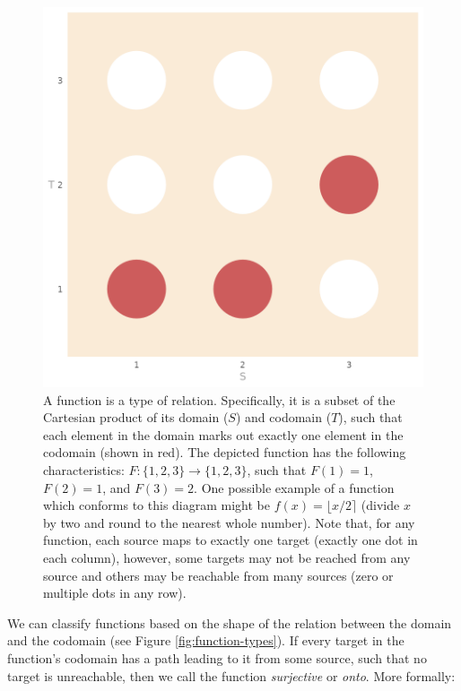 \documentclass[
]{book}
\theoremstyle{definition}
\theoremstyle{definition}
\theoremstyle{definition}
\theoremstyle{definition}
\theoremstyle{remark}
\begin{document}
\begin{figure}

{\centering \includegraphics[width=1\linewidth,height=1\textheight]{./figures/functions-subset} 

}

\caption{A function is a type of relation. Specifically, it is a subset of the Cartesian product of its domain ($S$) and codomain ($T$), such that each element in the domain marks out exactly one element in the codomain (shown in red). The depicted function has the following characteristics: $F: \{ 1, 2, 3 \} \to \{ 1, 2, 3 \}$, such that $F(1) = 1$, $F(2) = 1$, and $F(3) = 2$. One possible example of a function which conforms to this diagram might be $f(x) = \lfloor x / 2 \rceil$ (divide $x$ by two and round to the nearest whole number). Note that, for any function, each source maps to exactly one target (exactly one dot in each column), however, some targets may not be reached from any source and others may be reachable from many sources (zero or multiple dots in any row).}\label{fig:function-subset}
\end{figure}

We can classify functions based on the shape of the relation between the domain and the codomain (see Figure \ref{fig:function-types}). If every target in the function's codomain has a path leading to it from some source, such that no target is unreachable, then we call the function \emph{surjective} or \emph{onto}. More formally:
\end{document}
